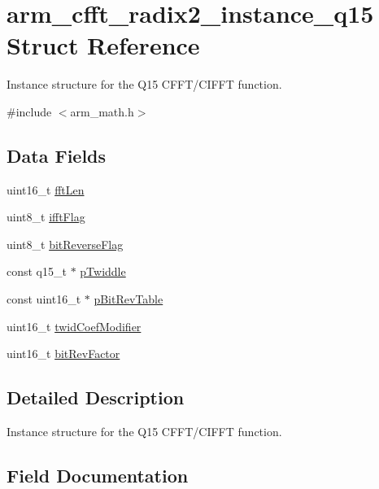 \hypertarget{structarm__cfft__radix2__instance__q15}{}\section{arm\+\_\+cfft\+\_\+radix2\+\_\+instance\+\_\+q15 Struct Reference}
\label{structarm__cfft__radix2__instance__q15}


Instance structure for the Q15 C\+F\+F\+T/\+C\+I\+F\+FT function.  




{\ttfamily \#include $<$arm\+\_\+math.\+h$>$}

\subsection*{Data Fields}
\begin{DoxyCompactItemize}
\item 
uint16\+\_\+t \mbox{\hyperlink{structarm__cfft__radix2__instance__q15_ab8db3bbe7c61e6bb8ca2a55e3446e11a}{fft\+Len}}
\item 
uint8\+\_\+t \mbox{\hyperlink{structarm__cfft__radix2__instance__q15_ad6ca6e223f986ebfd94c5ee1e410aa73}{ifft\+Flag}}
\item 
uint8\+\_\+t \mbox{\hyperlink{structarm__cfft__radix2__instance__q15_a09a221a818c6d0e064557a99e2fe9a8b}{bit\+Reverse\+Flag}}
\item 
const q15\+\_\+t $\ast$ \mbox{\hyperlink{structarm__cfft__radix2__instance__q15_a7f19217cfa0370f9e518caa882265386}{p\+Twiddle}}
\item 
const uint16\+\_\+t $\ast$ \mbox{\hyperlink{structarm__cfft__radix2__instance__q15_a3b229432d381b0a511a9cdbe3aa74e78}{p\+Bit\+Rev\+Table}}
\item 
uint16\+\_\+t \mbox{\hyperlink{structarm__cfft__radix2__instance__q15_afe772e5b5001c9d8e85032115a8df5bf}{twid\+Coef\+Modifier}}
\item 
uint16\+\_\+t \mbox{\hyperlink{structarm__cfft__radix2__instance__q15_a33386d95319dc3ee7097b3a8e52e01ec}{bit\+Rev\+Factor}}
\end{DoxyCompactItemize}


\subsection{Detailed Description}
Instance structure for the Q15 C\+F\+F\+T/\+C\+I\+F\+FT function. 

\subsection{Field Documentation}
\mbox{\label{structarm__cfft__radix2__instance__q15_a09a221a818c6d0e064557a99e2fe9a8b}} 
